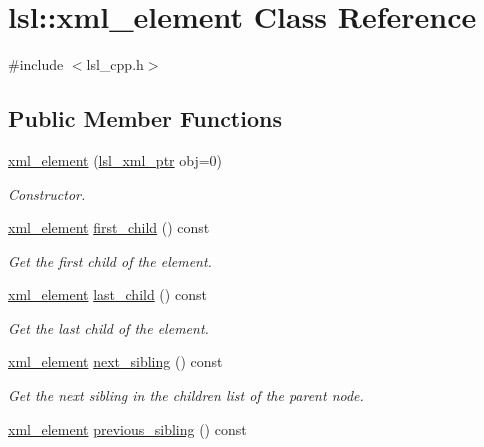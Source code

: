 \hypertarget{classlsl_1_1xml__element}{}\section{lsl\+:\+:xml\+\_\+element Class Reference}
\label{classlsl_1_1xml__element}


{\ttfamily \#include $<$lsl\+\_\+cpp.\+h$>$}

\subsection*{Public Member Functions}
\begin{DoxyCompactItemize}
\item 
\hyperlink{classlsl_1_1xml__element_a9a2c940a06714662f3cef5e9847e8cae}{xml\+\_\+element} (\hyperlink{namespacelsl_a5edc7a49a1a1be1634fe6dce3d59c59b}{lsl\+\_\+xml\+\_\+ptr} obj=0)
\begin{DoxyCompactList}\small\item\em Constructor. \end{DoxyCompactList}\item 
\hyperlink{classlsl_1_1xml__element}{xml\+\_\+element} \hyperlink{classlsl_1_1xml__element_ab68b7a1c63c2cb0eb4ce6361b94469b7}{first\+\_\+child} () const
\begin{DoxyCompactList}\small\item\em Get the first child of the element. \end{DoxyCompactList}\item 
\hyperlink{classlsl_1_1xml__element}{xml\+\_\+element} \hyperlink{classlsl_1_1xml__element_a12254f735a79a11b75718fe7c28186d0}{last\+\_\+child} () const
\begin{DoxyCompactList}\small\item\em Get the last child of the element. \end{DoxyCompactList}\item 
\hyperlink{classlsl_1_1xml__element}{xml\+\_\+element} \hyperlink{classlsl_1_1xml__element_a9637215f616b660789696e452b0e0591}{next\+\_\+sibling} () const
\begin{DoxyCompactList}\small\item\em Get the next sibling in the children list of the parent node. \end{DoxyCompactList}\item 
\hyperlink{classlsl_1_1xml__element}{xml\+\_\+element} \hyperlink{classlsl_1_1xml__element_a78c2e0b3d7bda2b5a2d478e3c0cdc87a}{previous\+\_\+sibling} () const

\end{DoxyCompactItemize}
